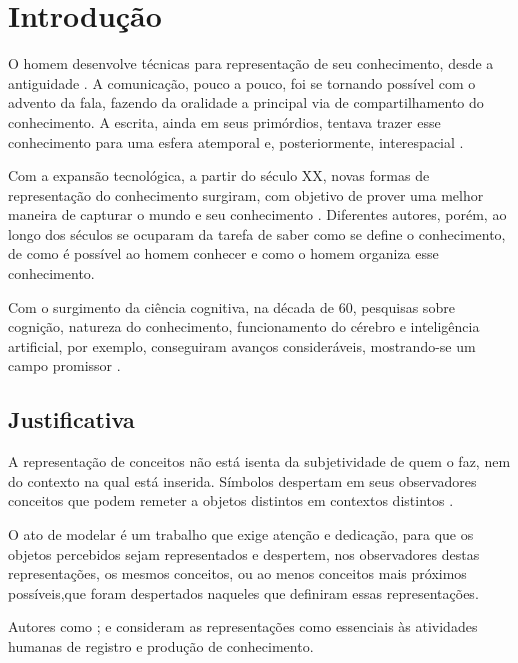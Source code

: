 \chapter{\hspace*{3pt} Introdução}

O homem desenvolve técnicas para representação de seu conhecimento, desde a antiguidade \cite{nonato:2009.teoria}. A comunicação, pouco a pouco, foi se tornando possível com o advento da fala, fazendo da oralidade a principal via de compartilhamento do conhecimento. A escrita, ainda em seus primórdios, tentava trazer esse conhecimento para uma esfera atemporal e, posteriormente, interespacial \cite{silva:2011.fala}. 

Com a expansão tecnológica, a partir do século XX, novas formas de representação do conhecimento surgiram, com objetivo de prover uma melhor maneira de capturar o mundo e seu conhecimento \cite{nonato:2009.teoria}. Diferentes autores, porém, ao longo dos séculos se ocuparam da tarefa de saber como se define o conhecimento, de como é possível ao homem conhecer e como o homem organiza esse conhecimento.

Com o surgimento da ciência cognitiva, na década de 60, pesquisas sobre cognição, natureza do conhecimento, funcionamento do cérebro e inteligência artificial, por exemplo, conseguiram avanços consideráveis, mostrando-se um campo promissor \cite{lacerda:2012.linguagem}.

\section{\hspace*{3pt} Justificativa}

A representação de conceitos não está isenta da subjetividade de quem o faz, nem do contexto na qual está inserida. Símbolos despertam em seus observadores conceitos que podem remeter a objetos distintos em contextos distintos \cite{nonato:2009.teoria}.

O ato de modelar é um trabalho que exige atenção e dedicação, para que os objetos percebidos sejam representados e despertem, nos observadores destas representações, os mesmos conceitos, ou ao menos conceitos mais próximos possíveis,que foram despertados naqueles que definiram essas representações.

Autores como ;  e  consideram as representações como essenciais às atividades humanas de registro e produção de conhecimento.

